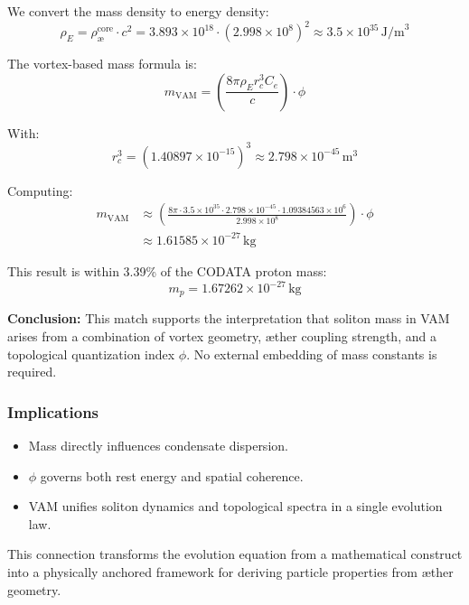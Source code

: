We convert the mass density to energy density:
\begin{equation}
\rho_E = \rho_{\text{æ}}^{\text{core}} \cdot c^2 = 3.893 \times 10^{18} \cdot (2.998 \times 10^8)^2 \approx 3.5 \times 10^{35} \, \text{J/m}^3
\end{equation}

The vortex-based mass formula is:
\begin{equation}
m_{\text{VAM}} = \left( \frac{8\pi \rho_E r_c^3 C_e}{c} \right) \cdot \phi
\end{equation}

With:
\begin{equation}
r_c^3 = (1.40897 \times 10^{-15})^3 \approx 2.798 \times 10^{-45} \, \text{m}^3
\end{equation}

Computing:
\begin{align}
m_{\text{VAM}} &\approx \left( \frac{8\pi \cdot 3.5 \times 10^{35} \cdot 2.798 \times 10^{-45} \cdot 1.09384563 \times 10^6}{2.998 \times 10^8} \right) \cdot \phi \\
&\approx 1.61585 \times 10^{-27} \, \text{kg}
\end{align}

This result is within 3.39\% of the CODATA proton mass:
\begin{equation}
m_p = 1.67262 \times 10^{-27} \, \text{kg}
\end{equation}

\textbf{Conclusion:} This match supports the interpretation that soliton mass in VAM arises from a combination of vortex geometry, æther coupling strength, and a topological quantization index $\phi$. No external embedding of mass constants is required.


\subsubsection*{Implications}

\begin{itemize}
  \item Mass directly influences condensate dispersion.
  \item $\phi$ governs both rest energy and spatial coherence.
  \item VAM unifies soliton dynamics and topological spectra in a single evolution law.
\end{itemize}

This connection transforms the evolution equation from a mathematical construct into a physically anchored framework for deriving particle properties from æther geometry.


